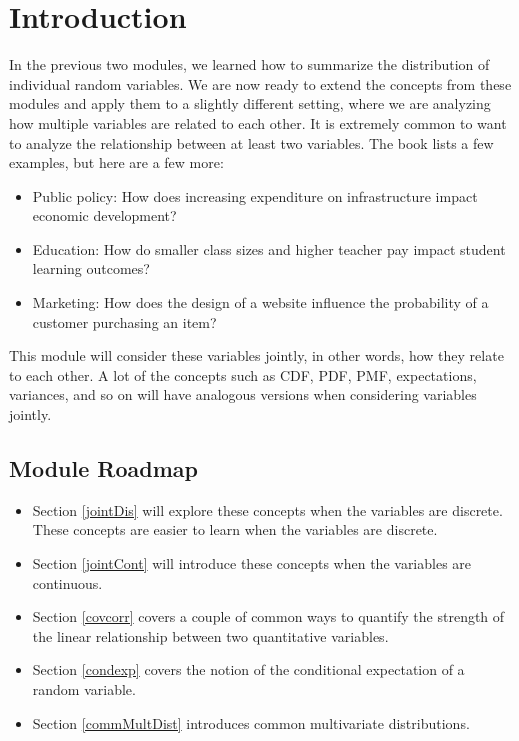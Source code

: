 \documentclass[
]{book}
\providecommand{\tightlist}{%
  \setlength{\itemsep}{0pt}\setlength{\parskip}{0pt}}
\begin{document}
\hypertarget{introduction-1}{%
\section{Introduction}\label{introduction-1}}

In the previous two modules, we learned how to summarize the distribution of individual random variables. We are now ready to extend the concepts from these modules and apply them to a slightly different setting, where we are analyzing how multiple variables are related to each other. It is extremely common to want to analyze the relationship between at least two variables. The book lists a few examples, but here are a few more:

\begin{itemize}
\tightlist
\item
  Public policy: How does increasing expenditure on infrastructure impact economic development?
\item
  Education: How do smaller class sizes and higher teacher pay impact student learning outcomes?
\item
  Marketing: How does the design of a website influence the probability of a customer purchasing an item?
\end{itemize}

This module will consider these variables jointly, in other words, how they relate to each other. A lot of the concepts such as CDF, PDF, PMF, expectations, variances, and so on will have analogous versions when considering variables jointly.

\hypertarget{module-roadmap-3}{%
\subsection{Module Roadmap}\label{module-roadmap-3}}

\begin{itemize}
\tightlist
\item
  Section \ref{jointDis} will explore these concepts when the variables are discrete. These concepts are easier to learn when the variables are discrete.
\item
  Section \ref{jointCont} will introduce these concepts when the variables are continuous.
\item
  Section \ref{covcorr} covers a couple of common ways to quantify the strength of the linear relationship between two quantitative variables.
\item
  Section \ref{condexp} covers the notion of the conditional expectation of a random variable.
\item
  Section \ref{commMultDist} introduces common multivariate distributions.
\end{itemize}
\end{document}
